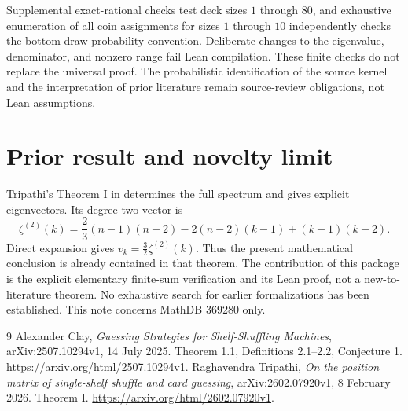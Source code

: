 \documentclass[11pt]{article}
\begin{document}
Supplemental exact-rational checks test deck sizes $1$ through $80$, and exhaustive enumeration of all coin assignments for sizes $1$ through $10$ independently checks the bottom-draw probability convention. Deliberate changes to the eigenvalue, denominator, and nonzero range fail Lean compilation. These finite checks do not replace the universal proof. The probabilistic identification of the source kernel and the interpretation of prior literature remain source-review obligations, not Lean assumptions.

\section{Prior result and novelty limit}
Tripathi's Theorem I in \cite{tripathi} determines the full spectrum and gives explicit eigenvectors. Its degree-two vector is
\[
 \zeta^{(2)}(k)=\frac23(n-1)(n-2)-2(n-2)(k-1)+(k-1)(k-2).
\]
Direct expansion gives $v_k=\tfrac32\zeta^{(2)}(k)$. Thus the present mathematical conclusion is already contained in that theorem. The contribution of this package is the explicit elementary finite-sum verification and its Lean proof, not a new-to-literature theorem. No exhaustive search for earlier formalizations has been established. This note concerns MathDB 369280 only.

\begin{thebibliography}{9}
 Alexander Clay, \emph{Guessing Strategies for Shelf-Shuffling Machines}, arXiv:2507.10294v1, 14 July 2025. Theorem 1.1, Definitions 2.1--2.2, Conjecture 1. \url{https://arxiv.org/html/2507.10294v1}.
 Raghavendra Tripathi, \emph{On the position matrix of single-shelf shuffle and card guessing}, arXiv:2602.07920v1, 8 February 2026. Theorem I. \url{https://arxiv.org/html/2602.07920v1}.
\end{thebibliography}
\end{document}

